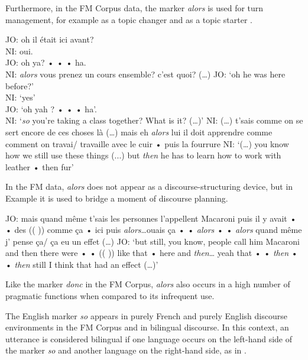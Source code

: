 \documentclass[output=paper]{langscibook}
\begin{document}
\noindent
Furthermore, in the FM Corpus data, the marker \textit{alors} is used for turn management, for example as a topic changer  and as a topic starter .

\begin{exe}
    \ex\label{hennecke:ex:22} JO: oh il était ici avant? \\
    NI: oui. \\
    JO: oh ya? • • • ha. \\
    NI: \textit{alors} vous prenez un cours ensemble? c’est quoi? (…)
    \glt JO: ‘oh he was here before?’ \\
    NI: ‘yes’ \\
    JO: ‘oh yah ? • • • ha’. \\
    NI: ‘\textit{so} you’re taking a class together? What is it? (…)’
    \ex\label{hennecke:ex:23} NI: (…) t’sais comme on se sert encore de ces choses là (…) mais eh \textit{alors} lui il doit apprendre comme comment on travai/ travaille avec le cuir • puis la fourrure
    \glt NI: ‘(…) you know how we still use these things (...) but \textit{then} he has to learn how to work with leather •  then fur’
\end{exe}

\noindent
In the FM data, \textit{alors} does not appear as a discourse-structuring device, but in Example  it is used to bridge a moment of discourse planning.

\begin{exe}
    \ex\label{hennecke:ex:24} JO: mais quand même t’sais les personnes l’appellent Macaroni puis il y avait • • des (( )) comme ça • ici puis \textit{alors}…ouais ça • • \textit{alors} • • \textit{alors} quand même j’ pense ça/ ça eu un effet (…)
    \glt JO: ‘but still, you know, people call him Macaroni and then there were • • (( )) like that • here and \textit{then}… yeah that • • \textit{then} • • \textit{then} still I think that had an effect (…)’
\end{exe}

\noindent
Like the marker \textit{donc} in the FM Corpus, \textit{alors} also occurs in a high number of pragmatic functions when compared to its infrequent use. 

The English marker \textit{so} appears in purely French and purely English discourse environments in the FM Corpus and in bilingual discourse. In this context, an utterance is considered bilingual if one language occurs on the left-hand side of the marker \textit{so} and another language on the right-hand side, as in .
\end{document}
